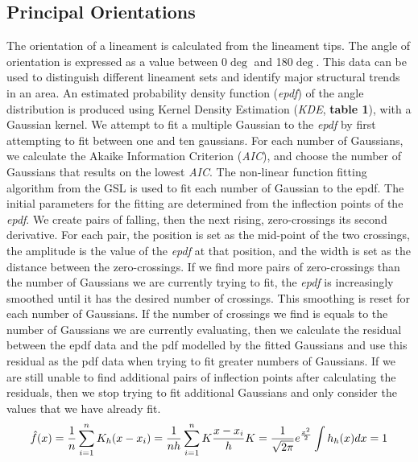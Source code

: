\documentclass[a4paper,fleqn]{cas-sc}
\begin{document}
\subsection{Principal Orientations}\label{principal_orientations}
The orientation of a lineament is calculated from the lineament tips. The angle of orientation is expressed as a value between 0$\deg$ and 180$\deg$. This data can be used to distinguish different lineament sets and identify major structural trends in an area. An estimated probability density function (\textit{epdf}) of the angle distribution is produced using Kernel Density Estimation (\textit{KDE}, \textbf{table 1}), with a Gaussian kernel. We attempt to fit a multiple Gaussian to the \textit{epdf} by first attempting to fit between one and ten gaussians. For each number of Gaussians, we calculate the Akaike Information Criterion (\textit{AIC}), and choose the number of Gaussians that results on the lowest \textit{AIC}. The non-linear function fitting algorithm from the GSL is used to fit each number of Gaussian to the epdf. The initial parameters for the fitting are determined from the inflection points of the \textit{epdf}. We create pairs of falling, then the next rising, zero-crossings its second derivative. For each pair, the position is set as the mid-point of the two crossings, the amplitude is the value of the \textit{epdf} at that position, and the width is set as the distance between the zero-crossings. If we find more pairs of zero-crossings than the number of Gaussians we are currently trying to fit, the \textit{epdf} is increasingly smoothed until it has the desired number of crossings. This smoothing is reset for each number of Gaussians. If the number of crossings we find is equals to the number of Gaussians we are currently evaluating, then we calculate the residual between the epdf data and the pdf modelled by the fitted Gaussians and use this residual as the pdf data when trying to fit greater numbers of Gaussians. If we are still unable to find additional pairs of inflection points after calculating the residuals, then we stop trying to fit additional Gaussians and only consider the values that we have already fit.
\begin{equation}
\hat{f}(x) = \frac{1}{n}\sum\limits_{i=1}^n K_h (x-x_i) = \frac{1}{nh}\sum\limits_{i=1}^n K\frac{x-x_i}{h} \\
 K =\frac{1}{\sqrt{2\pi}}e^{\frac{x^2}{2}} \\
 \int h_h(x)dx = 1
\end{equation}
\end{document}
